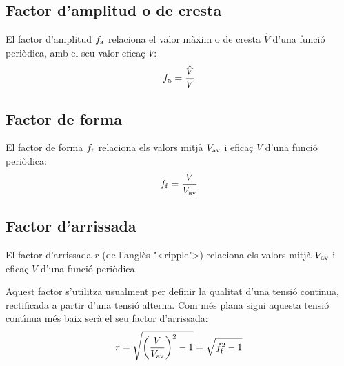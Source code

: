 \subsection{Factor d'amplitud o de cresta}

El factor d'amplitud $f_\mathrm{a}$ relaciona el valor m\`{a}xim o de cresta
$\hat{V}$ d'una funci\'{o} peri\`{o}dica, amb el seu valor efica\c{c} $V$:
\begin{equation}
    f_\mathrm{a} = \frac{\hat{V}}{V}
\end{equation}

\subsection{Factor de forma}

El factor de forma $f_\mathrm{f}$ relaciona els valors mitj\`{a} $V_\mathrm{av}$
i efica\c{c} $V$ d'una funci\'{o} peri\`{o}dica:
\begin{equation}
    f_\mathrm{f} = \frac{V}{V_\mathrm{av}}
\end{equation}

\subsection{Factor d'arrissada}

El factor d'arrissada $r$ (de l'angl\`{e}s {"<}ripple{">}) relaciona els
valors mitj\`{a} $V_\mathrm{av}$ i efica\c{c} $V$ d'una funci\'{o} peri\`{o}dica.

Aquest factor s'utilitza usualment per definir la qualitat d'una
tensi\'{o} continua, rectificada a partir d'una tensi\'{o} alterna. Com m\'{e}s
plana sigui aquesta tensi\'{o} cont\'{\i}nua m\'{e}s baix ser\`{a} el seu factor
d'arrissada:
\begin{equation}
    r = \sqrt{\left(\frac{V}{V_\mathrm{av}}\right)^2-1} = \sqrt{f_\mathrm{f}^2-1}
\end{equation}

